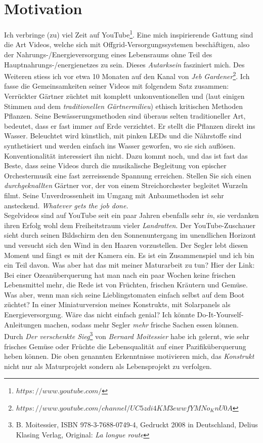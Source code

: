 \documentclass[12pt,titlepage,a4paper]{article}
\begin{document}
\section{Motivation}
Ich verbringe (zu) viel Zeit auf YouTube\footnote{$https://www.youtube.com/$}. Eine mich inspirierende Gattung sind die Art Videos, welche sich mit Offgrid-Versorgungssystemen beschäftigen, also der Nahrungs-/Energieversorgung eines Lebensraums ohne Teil des Hauptnahrungs-/energienetzes zu sein. Dieses \textit{Autarksein} fasziniert mich. Des Weiteren stiess ich vor etwa 10 Monaten auf den Kanal von \textit{Jeb Gardener}\footnote{$https://www.youtube.com/channel/UC5zdi4KM3ewwfYMNo_KnU0A$}. Ich fasse die Gemeinsamkeiten seiner Videos mit folgendem Satz zusammen: Verrückter Gärtner züchtet mit komplett unkonventionellen und (laut einigen Stimmen aud dem \textit{traditionellen Gärtnermilieu}) ethisch kritischen Methoden Pflanzen. Seine Bewässerungsmethoden sind überaus selten traditioneller Art, bedeutet, dass er fast immer auf Erde verzichtet. Er stellt die Pflanzen direkt ins Wasser. Beleuchtet wird künstlich, mit pinken LEDs und die Nährstoffe sind synthetisiert und werden einfach ins Wasser geworfen, wo sie sich auflösen. Konventionalität interessiert ihn nicht. Dazu kommt noch, und das ist fast das Beste, dass seine Videos durch die musikalische Begleitung von epischer Orchestermusik eine fast zerreissende Spannung erreichen. Stellen Sie sich einen \textit{durchgeknallten} Gärtner vor, der von einem Streichorchester begleitet Wurzeln filmt. Seine Unverdrossenheit im Umgang mit Anbaumethoden ist sehr ansteckend. \textit{Whatever gets the job done.} \\ Segelvideos sind auf YouTube seit ein paar Jahren ebenfalls sehr \textit{in}, sie verdanken ihren Erfolg wohl dem Freiheitstraum vieler \textit{Landratten}. Der YouTube-Zuschauer sieht durch seinen Bildschirm den den Sonnenuntergang im unendlichen Horizont und versucht sich den Wind in den Haaren vorzustellen. Der Segler lebt diesen Moment und fängt es mit der Kamera ein. Es ist ein Zusammenspiel und ich bin ein Teil davon. Was aber hat das mit meiner Maturarbeit zu tun? Hier der Link: Bei einer Ozeanüberquerung hat man nach ein paar Wochen keine frischen Lebensmittel mehr, die Rede ist von Früchten, frischen Kräutern und Gemüse. Was aber, wenn man sich seine Lieblingstomaten einfach selbst auf dem Boot züchtet? In einer Miniaturversion meines Konstrukts, mit Solarpanels als Energieversorgung. Wäre das nicht einfach genial? Ich könnte Do-It-Yourself-Anleitungen machen, sodass mehr Segler \textit{mehr} frische Sachen essen können. Durch \textit{Der verschenkte Sieg}\footnote{B. Moitessier, ISBN 978-3-7688-0749-4, Gedruckt 2008 in Deutschland, Delius Klasing Verlag, Original: \textit{La longue route}} von \textit{Bernard Moitessier} habe ich gelernt, wie sehr frisches Gemüse oder Früchte die Lebensqualität auf einer Pazifiküberquerung heben können. Die oben genannten Erkenntnisse motivieren mich, das \textit{Konstrukt} nicht nur als Maturprojekt sondern als Lebensprojekt zu verfolgen.
\newpage
\end{document}
